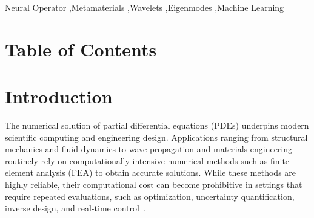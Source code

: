 \documentclass[preprint,review,12pt,numafflabel]{elsarticle}
\begin{document}
\begin{frontmatter}


\begin{keyword}
Neural Operator \sep Metamaterials \sep Wavelets \sep Eigenmodes \sep Machine Learning


\end{keyword}

\end{frontmatter}



\newpage
\section*{Table of Contents}
\begingroup
  \renewcommand{\contentsname}{}
  \tableofcontents
\endgroup
\newpage
\section{Introduction}
\label{introduction}

The numerical solution of partial differential equations (PDEs) underpins modern scientific computing and engineering design. Applications ranging from structural mechanics and fluid dynamics to wave propagation and materials engineering routinely rely on computationally intensive numerical methods such as finite element analysis (FEA) to obtain accurate solutions. While these methods are highly reliable, their computational cost can become prohibitive in settings that require repeated evaluations, such as optimization, uncertainty quantification, inverse design, and real-time control~\cite{Zhang2024uq,hussein2014dynamics}.
\end{document}
